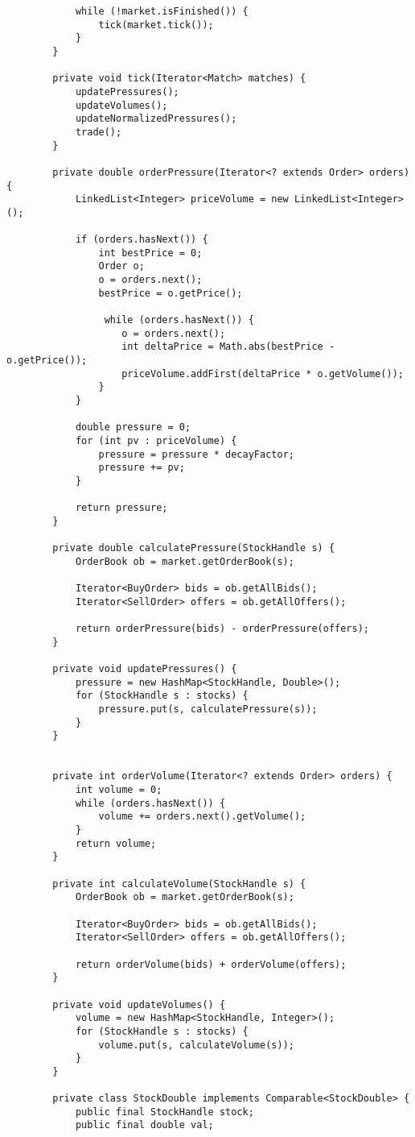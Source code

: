 \documentclass[11pt]{article}
\begin{document}
\begin{verbatim}
			while (!market.isFinished()) {
				tick(market.tick());
			}
		}
		
		private void tick(Iterator<Match> matches) {
			updatePressures();
			updateVolumes();
			updateNormalizedPressures();
			trade();
		}
		
		private double orderPressure(Iterator<? extends Order> orders) {
			LinkedList<Integer> priceVolume = new LinkedList<Integer>();		
			
			if (orders.hasNext()) {
				int bestPrice = 0;
				Order o;
				o = orders.next();
				bestPrice = o.getPrice();
				
				 while (orders.hasNext()) {
					o = orders.next();
					int deltaPrice = Math.abs(bestPrice - o.getPrice());
					priceVolume.addFirst(deltaPrice * o.getVolume());	
				}
			}
			
			double pressure = 0;
			for (int pv : priceVolume) {
				pressure = pressure * decayFactor;
				pressure += pv;
			}
			
			return pressure;
		}
		
		private double calculatePressure(StockHandle s) {
			OrderBook ob = market.getOrderBook(s);
			
			Iterator<BuyOrder> bids = ob.getAllBids();
			Iterator<SellOrder> offers = ob.getAllOffers();
			
			return orderPressure(bids) - orderPressure(offers);
		}
		
		private void updatePressures() {
			pressure = new HashMap<StockHandle, Double>();
			for (StockHandle s : stocks) {
				pressure.put(s, calculatePressure(s));
			}
		}
		
		
		private int orderVolume(Iterator<? extends Order> orders) {
			int volume = 0;
			while (orders.hasNext()) {
				volume += orders.next().getVolume();
			}
			return volume;
		}
		
		private int calculateVolume(StockHandle s) {
			OrderBook ob = market.getOrderBook(s);
			
			Iterator<BuyOrder> bids = ob.getAllBids();
			Iterator<SellOrder> offers = ob.getAllOffers();
			
			return orderVolume(bids) + orderVolume(offers);
		}
		
		private void updateVolumes() {
			volume = new HashMap<StockHandle, Integer>();
			for (StockHandle s : stocks) {
				volume.put(s, calculateVolume(s));
			}
		}
		
		private class StockDouble implements Comparable<StockDouble> {
			public final StockHandle stock;
			public final double val;
			

\end{verbatim}
\end{document}
